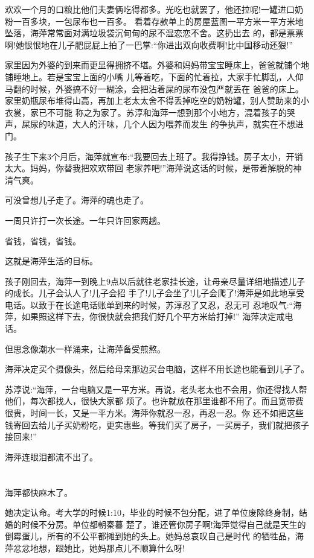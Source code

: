 \documentclass[11pt,a4paper,onecolumn]{article}
\begin{document}
欢欢一个月的口粮比他们夫妻俩吃得都多。光吃也就罢了，他还拉呢!一罐进口奶粉一百多块，一包尿布也一百多。
看着存款单上的房屋蓝图一平方米一平方米地坠落，海萍常常面对满垃圾袋沉甸甸的尿不湿恋恋不舍。这扔出去
的，都是票票啊!她恨恨地在儿子肥屁屁上拍了一巴掌:``你进出双向收费啊!比中国移动还狠!''

家里因为外婆的到来而更显得拥挤不堪。外婆和妈妈带宝宝睡床上，爸爸就铺个地铺睡地上。若是宝宝上面的小嘴
儿等着吃，下面的忙着拉，大家手忙脚乱，人仰马翻的时候，外婆搞不好一糊涂，会把沾着屎的尿布没包严就丢在
爸爸的床上。家里奶瓶尿布堆得山高，再加上老太太舍不得丢掉吃空的奶粉罐，别人赞助来的小衣裳，家已不可能
称之为家了。苏淳和海萍一想到那个小地方，混着孩子的哭声，屎尿的味道，大人的汗味，几个人因为喂养而发生
的争执声，就实在不想进门。

孩子生下来3个月后，海萍就宣布:``我要回去上班了。我得挣钱。房子太小，开销太大。妈妈，你替我把欢欢带回
老家养吧!''海萍说这话的时候，是带着解脱的神清气爽。

可没曾想儿子走了。海萍的魂也走了。

一周只许打一次长途。一年只许回家两趟。

省钱，省钱，省钱。

这就是海萍生活的目标。

孩子刚回去，海萍一到晚上9点以后就往老家挂长途，让母亲尽量详细地描述儿子的成长。儿子会认人了!儿子会招
手了!儿子会坐了!儿子会爬了!海萍是如此地享受电话。以致于在长途电话账单到来的时候，苏淳忍了又忍，忍无可
忍地叹气:``海萍，如果照这样下去，你很快就会把我们好几个平方米给打掉!'' 海萍决定戒电话。

但思念像潮水一样涌来，让海萍备受煎熬。

海萍决定买个摄像头，然后给母亲那边买台电脑，这样不用长途也能看到儿子了。

苏淳说:``海萍，一台电脑又是一平方米。再说，老头老太也不会用，你还得找人帮他们，每次都找人，很快大家都
烦了。也许就放在那里谁都不用了。而且宽带费很贵，时间一长，又是一平方米。海萍你就忍一忍，再忍一忍。你
还不如把这些钱寄回去给儿子买奶粉吃，更实惠些。等我们买了房子，一买房子，我们就把孩子接回来!''

海萍连眼泪都流不出了。

\section[\thesection]{}

海萍都快麻木了。

她决定认命。考大学的时候1:10，毕业的时候不包分配，进了单位废除终身制，结婚的时候不分房。单位都朝秦暮
楚了，谁还管你房子啊!海萍觉得自己就是天生的倒霉蛋儿，所有的不公平都摊到她的头上。她妈总哀叹自己是时代
的牺牲品，海萍忿忿地想，跟她比，她妈那点儿不顺算什么呀!
\end{document}
